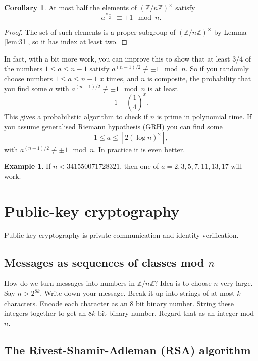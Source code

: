 \documentclass{article}
\newcommand{\Z}{\mathbb{Z}}
\newcommand{\rb}[1]{\left( #1 \right)}
\newcommand{\unit}[1]{\rb{\Z / #1\Z}^\times}
\theoremstyle{definition}\newtheorem{definition}{Definition}
\theoremstyle{definition}\newtheorem{remark}[definition]{Remark}
\theoremstyle{definition}\newtheorem*{example}{Example}
\theoremstyle{definition}\newtheorem*{note}{Note}
\newtheorem{corollary}[definition]{Corollary}
\begin{document}
\begin{corollary}
At most half the elements of $ \unit{n} $ satisfy
$$ a^{\tfrac{n - 1}{2}} \equiv \pm 1 \mod n. $$
\end{corollary}

\begin{proof}
The set of such elements is a proper subgroup of $ \unit{n} $ by Lemma \ref{lem:31}, so it has index at least two.
\end{proof}

In fact, with a bit more work, you can improve this to show that at least $ 3 / 4 $ of the numbers $ 1 \le a \le n - 1 $ satisfy $ a^{\rb{n - 1} / 2} \not\equiv \pm 1 \mod n $. So if you randomly choose numbers $ 1 \le a \le n - 1 $ $ x $ times, and $ n $ is composite, the probability that you find some $ a $ with $ a^{\rb{n - 1} / 2} \not\equiv \pm 1 \mod n $ is at least
$$ 1 - \rb{\dfrac{1}{4}}^x. $$
This gives a probabilistic algorithm to check if $ n $ is prime in polynomial time. If you assume generalised Riemann hypothesis (GRH) you can find some
$$ 1 \le a \le \left\lceil 2 \rb{\log n}^2 \right\rceil, $$
with $ a^{\rb{n - 1} / 2} \not\equiv \pm 1 \mod n $. In practice it is even better.

\begin{example}
If $ n < 341550071728321 $, then one of $ a = 2, 3, 5, 7, 11, 13, 17 $ will work.
\end{example}

\pagebreak

\section{Public-key cryptography}

Public-key cryptography is private communication and identity verification.

\subsection{Messages as sequences of classes mod $ n $}

How do we turn messages into numbers in $ \Z / n\Z $? Idea is to choose $ n $ very large. Say $ n > 2^{8k} $. Write down your message. Break it up into strings of at most $ k $ characters. Encode each character as an $ 8 $ bit binary number. String these integers together to get an $ 8k $ bit binary number. Regard that as an integer mod $ n $.

\subsection{The Rivest-Shamir-Adleman (RSA) algorithm}
\end{document}
